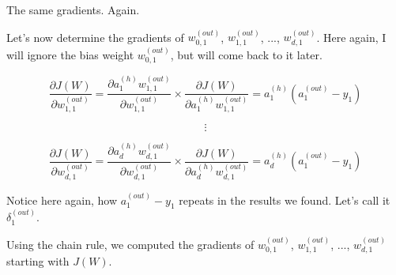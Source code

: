 \documentclass[../main.tex]{subfiles}
\begin{document}
\vspace{5mm} %

The same gradients. Again.

\vspace{5mm} %

Let's now determine the gradients of $w_{0,1}^{(out)}$, $w_{1,1}^{(out)}$, ..., $w_{d,1}^{(out)}$.
Here again, I will ignore the bias weight $w_{0,1}^{(out)}$, but will come back to it later.

\[
    \frac{\partial J(W)}{\partial w_{1,1}^{(out)}} =
    \frac{\partial a_1^{(h)}w_{1,1}^{(out)}}{\partial w_{1,1}^{(out)}} \times
    \frac{\partial J(W)}{\partial a_1^{(h)}w_{1,1}^{(out)}}  =
    a_1^{(h)}(a_{1}^{(out)} - y_{1})
\]

\[ \vdots \]

\[
    \frac{\partial J(W)}{\partial w_{d,1}^{(out)}} =
    \frac{\partial a_d^{(h)}w_{d,1}^{(out)}}{\partial w_{d,1}^{(out)}} \times
    \frac{\partial J(W)}{\partial a_d^{(h)}w_{d,1}^{(out)}}  =
    a_d^{(h)}(a_{1}^{(out)} - y_{1})
\]

\vspace{1cm} %

Notice here again, how $a_{1}^{(out)} - y_{1}$ repeats in the results we found.
Let's call it $\delta_1^{(out)}$.

\vspace{1cm} %

Using the chain rule, we computed the gradients of $w_{0,1}^{(out)}$, $w_{1,1}^{(out)}$, ..., $w_{d,1}^{(out)}$
starting with $J(W)$.
\end{document}
